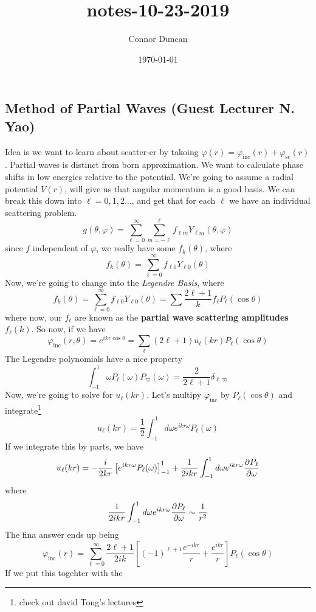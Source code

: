 \documentclass{article}
\author{Connor Duncan}
\date{\today}
\title{notes-10-23-2019}
\theoremstyle{definition}
\begin{document}
\subsection{Method of Partial Waves (Guest Lecturer N. Yao)} Idea is we want to learn about scatter-er by takoing $\varphi(r)=\varphi_\mathrm{inc}(r)+\varphi_\mathrm{sc}(r)$. Partial waves is distinct from born approximation. We want to calculate phase shifts in low energies relative to the potential. We're going to assume a radial potential $V(r)$, will give us that angular momentum is a good basis. We can break this down into $\ell=0,1,2\dots$, and get that for each $\ell$ we have an individual scattering problem. \begin{equation} g(\theta,\varphi)=\sum_{\ell=0}^\infty\sum_{m=-\ell}^\ell f_{\ell m}Y_{\ell m}(\theta,\varphi) \end{equation} since $f$ independent of $\varphi$, we really have some $f_k(\theta)$, where \begin{equation} f_{k}(\theta)=\sum_{\ell=0}^\infty f_{\ell 0}Y_{\ell 0}(\theta) \end{equation} Now, we're going to change into the \emph{Legendre Basis}, where \begin{equation} f_{k}(\theta)=\sum_{\ell=0}^\infty f_{\ell 0}Y_{\ell 0}(\theta)=\sum\frac{2\ell+1}{k}f_\ell P_\ell(\cos\theta) \end{equation} where now, our $f_\ell$ are known as the \textbf{partial wave scattering amplitudes} $f_\ell(k)$. So now, if we have \begin{equation} \varphi_\mathrm{inc}(r,\theta)=e^{ikr\cos\theta}=\sum_{\ell}(2\ell+1)u_\ell(kr)P_\ell(\cos\theta) \end{equation} The Legendre polynomials have a nice property \begin{equation} \int_{-1}^1\omega P_\ell(\omega)P_\varpi(\omega)=\frac{2}{2\ell+1}\delta_{\ell\varpi} \end{equation} Now, we're going to solve for $u_\ell(kr)$. Let's multipy $\varphi_\mathrm{inc}$ by $P_\ell(\cos\theta)$ and integrate\footnote{check out david Tong's lectures} \begin{equation} u_\ell(kr)=\frac{1}{2}\int_{-1}^{1}d\omega e^{ikr\omega}P_\ell(\omega) \end{equation} If we integrate this by parts, we have \begin{equation} u_\ell(kr)=-\frac{i}{2kr}\left[e^{ikr\omega}P_\ell(\omega)\right]_{-1}^1+\frac{1}{2ikr}\int_{-1}^1d\omega e^{ikr\omega}\pdv{P_\ell}{\omega} \end{equation} where \begin{equation} \frac{1}{2ikr}\int_{-1}^1d\omega e^{ikr\omega}\pdv{P_\ell}{\omega}\sim\frac{1}{r^2} \end{equation} The fina answer ends up being \begin{equation} \varphi_\mathrm{inc}(r)=\sum_{\ell=0}^\infty\frac{2\ell+1}{2ik}\left[(-1)^{\ell+1}\frac{e^{-ikr}}{r}+\frac{e^{ikr}}{r}\right]P_\ell(\cos\theta) \end{equation} If we put this togehter with the 
\end{document}

